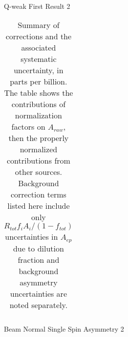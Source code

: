 \documentclass[xcolor=x11names,compress,8pt]{beamer}
\renewcommand{\(}{\begin{columns}}
\renewcommand{\)}{\end{columns}}
\newcommand{\<}[1]{\begin{column}{#1}}
\renewcommand{\>}{\end{column}}
\begin{document}
\begin{frame}{Q-weak First Result 2}
\begin{table}[th]
\begin{tabular}{@{} l @{}|@{} c @{} c  r }
\end{tabular}
\caption{Summary of corrections and the associated systematic uncertainty, in parts per billion. The table shows the contributions of normalization factors on $A_{raw}$, then the properly normalized contributions from other sources. Background correction terms listed here include only $R_{tot} f_{i}A_{i}/(1 - f_{tot})$ uncertainties in $A_{ep}$ due to dilution fraction and background asymmetry uncertainties are noted separately.}
\label{tab-3}       %
\end{table}


\end{frame}



\begin{frame}{Beam Normal Single Spin Asymmetry 2}


\end{frame}
\end{document}
